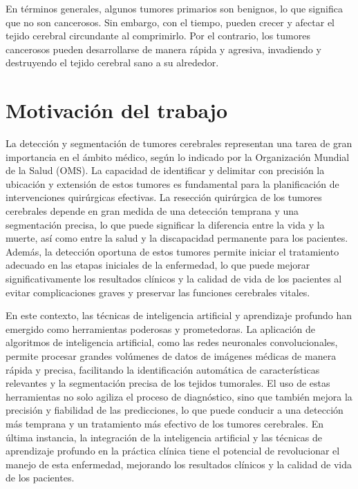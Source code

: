 En términos generales, algunos tumores primarios son benignos, lo que significa que no son cancerosos. Sin embargo, con el tiempo, pueden crecer y afectar el tejido cerebral circundante al comprimirlo. Por el contrario, los tumores cancerosos pueden desarrollarse de manera rápida y agresiva, invadiendo y destruyendo el tejido cerebral sano a su alrededor.

\section{Motivación del trabajo}

La detección y segmentación de tumores cerebrales representan una tarea de gran importancia en el ámbito médico, según lo indicado por la Organización Mundial de la Salud (OMS). La capacidad de identificar y delimitar con precisión la ubicación y extensión de estos tumores es fundamental para la planificación de intervenciones quirúrgicas efectivas. La resección quirúrgica de los tumores cerebrales depende en gran medida de una detección temprana y una segmentación precisa, lo que puede significar la diferencia entre la vida y la muerte, así como entre la salud y la discapacidad permanente para los pacientes. Además, la detección oportuna de estos tumores permite iniciar el tratamiento adecuado en las etapas iniciales de la enfermedad, lo que puede mejorar significativamente los resultados clínicos y la calidad de vida de los pacientes al evitar complicaciones graves y preservar las funciones cerebrales vitales.

En este contexto, las técnicas de inteligencia artificial y aprendizaje profundo han emergido como herramientas poderosas y prometedoras. La aplicación de algoritmos de inteligencia artificial, como las redes neuronales convolucionales, permite procesar grandes volúmenes de datos de imágenes médicas de manera rápida y precisa, facilitando la identificación automática de características relevantes y la segmentación precisa de los tejidos tumorales. El uso de estas herramientas no solo agiliza el proceso de diagnóstico, sino que también mejora la precisión y fiabilidad de las predicciones, lo que puede conducir a una detección más temprana y un tratamiento más efectivo de los tumores cerebrales. En última instancia, la integración de la inteligencia artificial y las técnicas de aprendizaje profundo en la práctica clínica tiene el potencial de revolucionar el manejo de esta enfermedad, mejorando los resultados clínicos y la calidad de vida de los pacientes.

